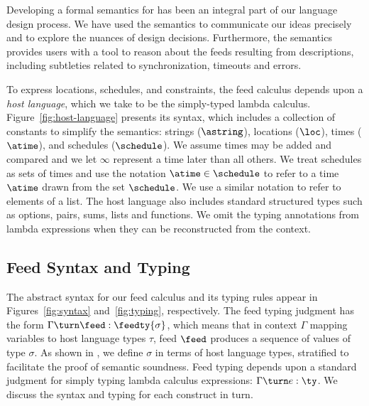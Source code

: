 



Developing a formal semantics for \padsd{} has been an
integral part of our language design process.  We have used the semantics to
communicate our ideas precisely and to explore the nuances of design
decisions. Furthermore, the semantics provides users with a tool to reason about the feeds
resulting from \padsd{} descriptions, including subtleties related to
synchronization, timeouts and errors.

To express locations, schedules, and constraints, the feed calculus
depends upon a {\em host language}, which we take to be the
simply-typed lambda calculus.  Figure~\ref{fig:host-language} presents
its syntax, which includes a collection of constants to simplify the
semantics: strings ($\astring$), locations ($\loc$), times ($\atime$),
and schedules ($\schedule$).  We assume times may be added and
compared and we let $\infty$ represent a time later than all others.
We treat schedules as sets of times and use the notation $\atime
\in \schedule$ to refer to a time $\atime$ drawn from the set
$\schedule$.  We use a similar notation to refer to elements of a
list.  The host language also includes standard structured types such as
options, pairs, sums, lists and functions.
We omit the typing annotations from lambda expressions when they can
be reconstructed from the context.


\subsection{Feed Syntax and Typing}

The abstract syntax for our feed calculus and its typing rules appear
in Figures~\ref{fig:syntax} and~\ref{fig:typing}, respectively.  The
feed typing judgment has the form $\Gamma \turn \feed :
\feedty{\sigma}$, which means that in context $\Gamma$ mapping
variables to host language types $\tau$, feed $\feed$ produces a
sequence of values of type $\sigma$.  As shown in ,
we define $\sigma$ in terms of host language types, stratified to
facilitate the proof of semantic soundness.  Feed typing depends upon
a standard judgment for simply typing lambda calculus expressions:
$\Gamma \turn e : \ty$.  We discuss the syntax and typing for each
construct in turn.



